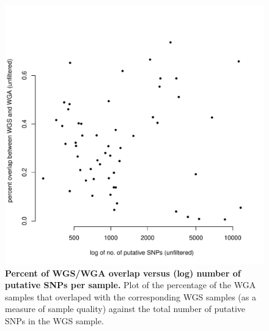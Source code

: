 \documentclass[11pt]{article} %
\begin{document}
\begin{figure}
\centerline{
\includegraphics[width=5in]{unfiltered_total_muts_v_percent_overlap.pdf} }
\caption{\textbf{Percent of WGS/WGA overlap versus (log) number of putative SNPs per sample.} Plot of the percentage of the WGA samples that overlaped with the corresponding WGS samples (as a measure of sample quality) against the total number of putative SNPs in the WGS sample.}
\end{figure}
\end{document}
